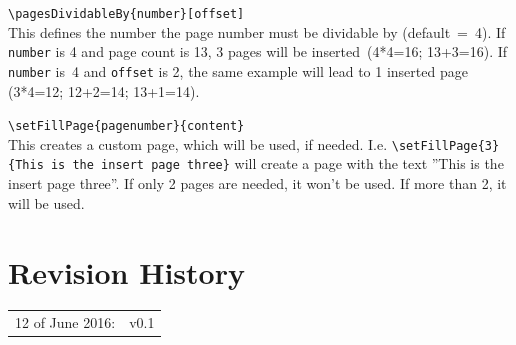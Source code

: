 \documentclass[11pt,a4paper]{scrartcl}
\begin{document}
\noindent\verb&\pagesDividableBy{number}[offset]&\\ This defines the number the page number must be dividable by (default~=~4). If \verb+number+ is 4 and page count is 13, 3 pages will be inserted~(4*4=16; 13+3=16). If \verb+number+ is~4 and \verb+offset+ is 2, the same example will lead to 1 inserted page (3*4=12; 12+2=14; 13+1=14).\bigskip

\noindent\verb&\setFillPage{pagenumber}{content}&\\
This creates a custom page, which will be used, if needed. I.e. \verb&\setFillPage{3}{This is the insert page three}& will create a page with the text ''This is the insert page three''. If only 2 pages are needed, it won't be used. If more than 2, it will be used.\bigskip


\section{Revision History}
\noindent
\begin{tabular}{l l}
12 of June 2016:& v0.1
\end{tabular}
\end{document}
